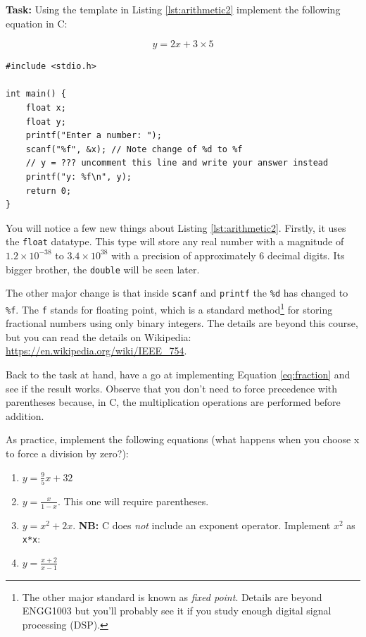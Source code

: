 \documentclass{lab}
\begin{document}
\textbf{Task:} Using the template in Listing \ref{lst:arithmetic2} implement the following equation in C:

\begin{equation}\label{eq:fraction}
y = 2x+3\times5
\end{equation}



\begin{lstlisting}[style=CStyle,caption=A basic arithmetic example,label=lst:arithmetic2]
#include <stdio.h>

int main() {
	float x;
	float y;
	printf("Enter a number: ");
	scanf("%f", &x); // Note change of %d to %f
	// y = ??? uncomment this line and write your answer instead
	printf("y: %f\n", y);
	return 0;
}
\end{lstlisting}

You will notice a few new things about Listing \ref{lst:arithmetic2}. Firstly, it uses the \texttt{float} datatype. This type will store any real number with a magnitude of $1.2 \times 10^{-38}$ to $3.4 \times 10^{38}$ with a precision of approximately 6 decimal digits. Its bigger brother, the \texttt{double} will be seen later.

The other major change is that inside \texttt{scanf} and \texttt{printf} the \texttt{\%d} has changed to \texttt{\%f}. The \texttt{f} stands for floating point, which is a standard method\footnote{The other major standard is known as \textit{fixed point}. Details are beyond ENGG1003 but you'll probably see it if you study enough digital signal processing (DSP).} for storing fractional numbers using only binary integers. The details are beyond this course, but you can read the details on Wikipedia: \url{https://en.wikipedia.org/wiki/IEEE_754}.

Back to the task at hand, have a go at implementing Equation \ref{eq:fraction} and see if the result works. Observe that you don't need to force precedence with parentheses because, in C, the multiplication operations are performed before addition.

As practice, implement the following equations (what happens when you choose x to force a division by zero?):


\begin{enumerate}
\item $y = \frac{9}{5} x + 32$
\item $y = \frac{x}{1 - x}$.  This one will require parentheses.
\item $y = x^2 + 2x$. \textbf{NB:} C does \textit{not} include an exponent operator. Implement $x^2$ as \texttt{x*x}:
\item $y = \frac{x + 2}{x - 1}$
\end{enumerate}
\end{document}
